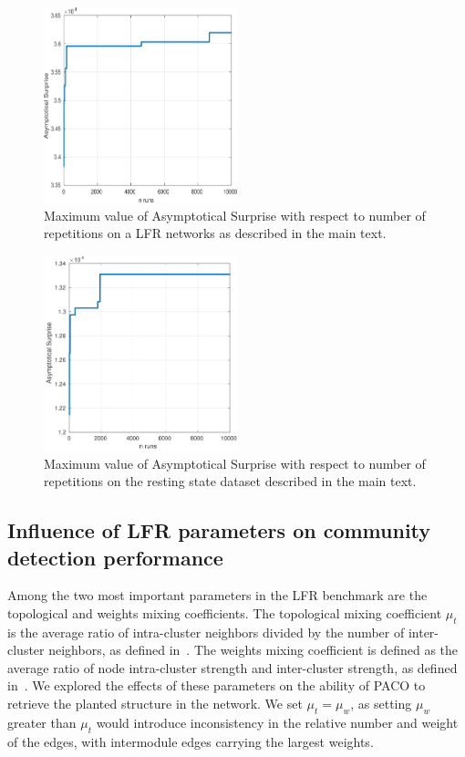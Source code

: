 \begin{figure}[htb!]
\centering
\includegraphics[width=0.5\textwidth]{images/paco_variability_nreps_lfr.png}
\caption{Maximum value of Asymptotical Surprise with respect to number of repetitions on a LFR networks as described in the main text.}
\label{fig:paco_variability_lfr}
\end{figure}
\begin{figure}[htb!]
\centering
\includegraphics[width=0.5\textwidth]{images/paco_variability_nreps_bullmore.png}
\caption{Maximum value of Asymptotical Surprise with respect to number of repetitions on the resting state dataset described in the main text.}
\label{fig:paco_variability_bullmore}
\end{figure}

\subsection{Influence of LFR parameters on community detection performance}
Among the two most important parameters in the LFR benchmark are the topological and weights mixing coefficients. 
The topological mixing coefficient $\mu_t$ is the average ratio of intra-cluster neighbors divided by the number of inter-cluster neighbors, as defined in~\cite{lancichinetti2008}. The weights mixing coefficient is defined as the average ratio of node intra-cluster strength and inter-cluster strength, as defined in~\cite{lancichinetti2009a}.
We explored the effects of these parameters on the ability of PACO to retrieve the planted structure in the network.
We set $\mu_t=\mu_w$, as setting $\mu_w$ greater than $\mu_t$ would introduce inconsistency in the relative number and weight of the edges, with intermodule edges carrying the largest weights.

